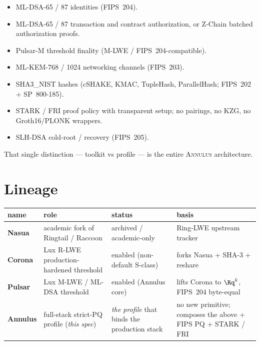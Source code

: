 \documentclass[11pt,a4paper]{article}
\newcommand{\Annulus}{\textsc{Annulus}}
\begin{document}
\begin{itemize}[leftmargin=*, itemsep=0pt]
\item ML-DSA-65 / 87 identities (FIPS~204).
\item ML-DSA-65 / 87 transaction and contract authorization, or
Z-Chain batched authorization proofs.
\item Pulsar-M threshold finality (M-LWE / FIPS~204-compatible).
\item ML-KEM-768 / 1024 networking channels (FIPS~203).
\item SHA3\_NIST hashes (cSHAKE, KMAC, TupleHash, ParallelHash;
FIPS~202 + SP~800-185).
\item STARK / FRI proof policy with transparent setup; no
pairings, no KZG, no Groth16/PLONK wrappers.
\item SLH-DSA cold-root / recovery (FIPS~205).
\end{itemize}

That single distinction --- toolkit vs profile --- is the entire
\Annulus{} architecture.

\section{Lineage}
\label{sec:lineage}

\begin{center}\small
\begin{tabular}{l l l l}
\toprule
name & role & status & basis \\
\midrule
\textbf{Nasua}   & academic fork of Ringtail / Raccoon          & archived / academic-only & Ring-LWE upstream tracker \\
\textbf{Corona}  & Lux R-LWE production-hardened threshold        & enabled (non-default S-class) & forks Nasua + SHA-3 + reshare \\
\textbf{Pulsar}  & Lux M-LWE / ML-DSA threshold                   & enabled (Annulus core) & lifts Corona to $\Rq^k$, FIPS~204 byte-equal \\
\textbf{Annulus} & full-stack strict-PQ profile (\emph{this spec}) & \emph{the profile} that binds the production stack & no new primitive; composes the above + FIPS PQ + STARK / FRI \\
\bottomrule
\end{tabular}
\end{center}

\end{document}
